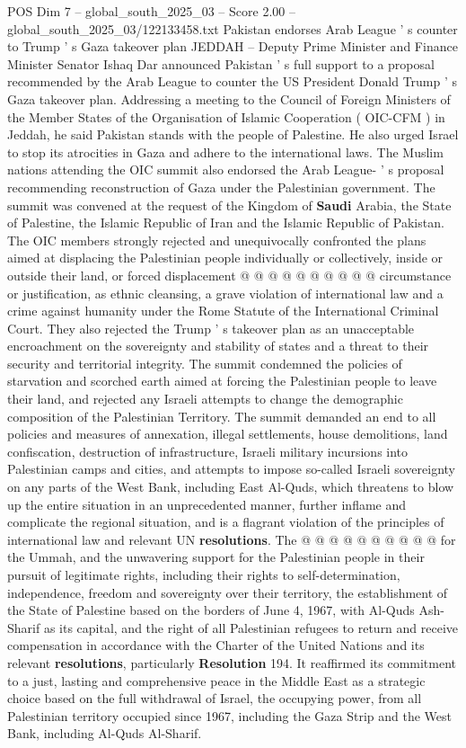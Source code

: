 \begin{textsample}{POS Dim 7 – global\_south\_2025\_03 – Score 2.00 – global\_south\_2025\_03/122133458.txt}  \label{ex:f7_pos_092}
Pakistan endorses Arab League ' s counter to Trump ' s Gaza takeover plan JEDDAH -- Deputy Prime Minister and Finance Minister Senator Ishaq Dar announced Pakistan ' s full support to a proposal recommended by the Arab League to counter the US President Donald Trump ' s Gaza takeover plan.
Addressing a meeting to the Council of Foreign Ministers of the Member States of the Organisation of Islamic Cooperation ( OIC-CFM ) in Jeddah, he said Pakistan stands with the people of Palestine.
He also urged Israel to stop its atrocities in Gaza and adhere to the international laws.
The Muslim nations attending the OIC summit also endorsed the Arab League- ' s proposal recommending reconstruction of Gaza under the Palestinian government.
The summit was convened at the request of the Kingdom of \textbf{Saudi} Arabia, the State of Palestine, the Islamic Republic of Iran and the Islamic Republic of Pakistan.
The OIC members strongly rejected and unequivocally confronted the plans aimed at displacing the Palestinian people individually or collectively, inside or outside their land, or forced displacement @ @ @ @ @ @ @ @ @ @ circumstance or justification, as ethnic cleansing, a grave violation of international law and a crime against humanity under the Rome Statute of the International Criminal Court.
They also rejected the Trump ' s takeover plan as an unacceptable encroachment on the sovereignty and stability of states and a threat to their security and territorial integrity.
The summit condemned the policies of starvation and scorched earth aimed at forcing the Palestinian people to leave their land, and rejected any Israeli attempts to change the demographic composition of the Palestinian Territory.
The summit demanded an end to all policies and measures of annexation, illegal settlements, house demolitions, land confiscation, destruction of infrastructure, Israeli military incursions into Palestinian camps and cities, and attempts to impose so-called Israeli sovereignty on any parts of the West Bank, including East Al-Quds, which threatens to blow up the entire situation in an unprecedented manner, further inflame and complicate the regional situation, and is a flagrant violation of the principles of international law and relevant UN \textbf{resolutions}.
The @ @ @ @ @ @ @ @ @ @ for the Ummah, and the unwavering support for the Palestinian people in their pursuit of legitimate rights, including their rights to self-determination, independence, freedom and sovereignty over their territory, the establishment of the State of Palestine based on the borders of June 4, 1967, with Al-Quds Ash-Sharif as its capital, and the right of all Palestinian refugees to return and receive compensation in accordance with the Charter of the United Nations and its relevant \textbf{resolutions}, particularly \textbf{Resolution} 194.
It reaffirmed its commitment to a just, lasting and comprehensive peace in the Middle East as a strategic choice based on the full withdrawal of Israel, the occupying power, from all Palestinian territory occupied since 1967, including the Gaza Strip and the West Bank, including Al-Quds Al-Sharif.

\end{textsample}
